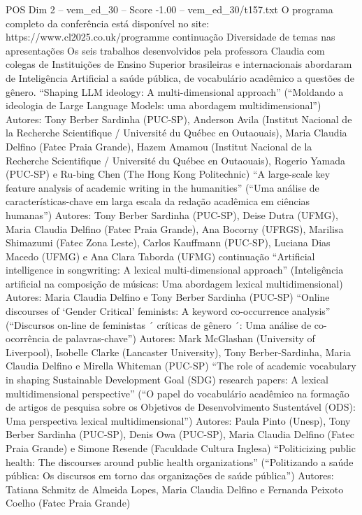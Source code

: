 \begin{textsample}{POS Dim 2 – vem\_ed\_30 – Score -1.00 – vem\_ed\_30/t157.txt}
O programa completo da conferência está disponível no site: https://www.cl2025.co.uk/programme continuação Diversidade de temas nas apresentações Os seis trabalhos desenvolvidos pela professora Claudia com colegas de Instituições de Ensino Superior brasileiras e internacionais abordaram de Inteligência Artificial a saúde pública, de vocabulário acadêmico a questões de gênero. “Shaping LLM ideology: A multi-dimensional approach” (“Moldando a ideologia de Large Language Models: uma abordagem multidimensional”) Autores: Tony Berber Sardinha (PUC-SP), Anderson Avila (Institut Nacional de la Recherche Scientifique / Université du Québec en Outaouais), Maria Claudia Delfino (Fatec Praia Grande), Hazem Amamou (Institut Nacional de la Recherche Scientifique / Université du Québec en Outaouais), Rogerio Yamada (PUC-SP) e Ru-bing Chen (The Hong Kong Politechnic) “A large-scale key feature analysis of academic writing in the humanities” (“Uma análise de características-chave em larga escala da redação acadêmica em ciências humanas”) Autores: Tony Berber Sardinha (PUC-SP), Deise Dutra (UFMG), Maria Claudia Delfino (Fatec Praia Grande), Ana Bocorny (UFRGS), Marilisa Shimazumi (Fatec Zona Leste), Carlos Kauffmann (PUC-SP), Luciana Dias Macedo (UFMG) e Ana Clara Taborda (UFMG) continuação “Artificial intelligence in songwriting: A lexical multi-dimensional approach” (Inteligência artificial na composição de músicas: Uma abordagem lexical multidimensional) Autores: Maria Claudia Delfino e Tony Berber Sardinha (PUC-SP) “Online discourses of ‘Gender Critical’ feminists: A keyword co-occurrence analysis” (“Discursos on-line de feministas ´ críticas de gênero ´: Uma análise de co-ocorrência de palavras-chave”) Autores: Mark McGlashan (University of Liverpool), Isobelle Clarke (Lancaster University), Tony Berber-Sardinha, Maria Claudia Delfino e Mirella Whiteman (PUC-SP) “The role of academic vocabulary in shaping Sustainable Development Goal (SDG) research papers: A lexical multidimensional perspective” (“O papel do vocabulário acadêmico na formação de artigos de pesquisa sobre os Objetivos de Desenvolvimento Sustentável (ODS): Uma perspectiva lexical multidimensional”) Autores: Paula Pinto (Unesp), Tony Berber Sardinha (PUC-SP), Denis Owa (PUC-SP), Maria Claudia Delfino (Fatec Praia Grande) e Simone Resende (Faculdade Cultura Inglesa) “Politicizing public health: The discourses around public health organizations” (“Politizando a saúde pública: Os discursos em torno das organizações de saúde pública”) Autores: Tatiana Schmitz de Almeida Lopes, Maria Claudia Delfino e Fernanda Peixoto Coelho (Fatec Praia Grande)

\end{textsample}
